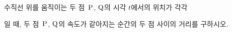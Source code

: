 수직선 위를 움직이는 두 점~$\mathrm{P}$, $\mathrm{Q}$의 시각 $t$에서의 위치가 각각 \par\smallskip{}\par\smallskip\noindent 일 때, 두 점~$\mathrm{P}$, $\mathrm{Q}$의 속도가 같아지는 순간의 두 점 사이의 거리를 구하시오.
